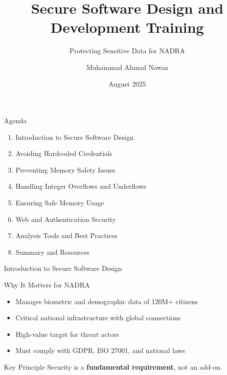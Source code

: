 \documentclass[12pt]{beamer}
\title{Secure Software Design and Development Training}
\subtitle{Protecting Sensitive Data for NADRA}
\author{Muhammad Ahmad Nawaz}
\institute{National Database \& Registration Authority (NADRA)}
\date{August 2025}
\begin{document}
\begin{frame}
  \titlepage
\end{frame}

\begin{frame}{Agenda}
  \begin{enumerate}
    \item Introduction to Secure Software Design
    \item Avoiding Hardcoded Credentials
    \item Preventing Memory Safety Issues
    \item Handling Integer Overflows and Underflows
    \item Ensuring Safe Memory Usage
    \item Web and Authentication Security
    \item Analysis Tools and Best Practices
    \item Summary and Resources
  \end{enumerate}
\end{frame}

\begin{frame}{Introduction to Secure Software Design}
  \begin{block}{Why It Matters for NADRA}
    \begin{itemize}
      \item Manages biometric and demographic data of 120M+ citizens
      \item Critical national infrastructure with global connections
      \item High-value target for threat actors
      \item Must comply with GDPR, ISO 27001, and national laws
    \end{itemize}
  \end{block}
  \begin{alertblock}{Key Principle}
    Security is a \textbf{fundamental requirement}, not an add-on.
  \end{alertblock}
\end{frame}
\end{document}

